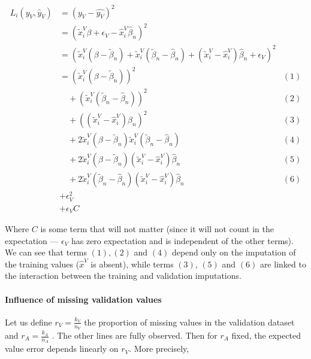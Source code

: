 \begin{align*}
L_i(y_V, \hat{y}_V) &= (y_V - \hat{y_V})^2 &\\
				&= (\tilde{x}_i^V \beta + \epsilon_V - \hat{x}_i^V \hat{\beta}_n)^2 &\\
				   &= (\tilde{x}_i^V(\beta - \tilde{\beta}_n) + \tilde{x}_i^V (\tilde{\beta}_n - \hat{\beta}_n) + (\tilde{x}_i^V - \hat{x}_i^V) \hat{\beta}_n + \epsilon_V)^2 & \\
				   &= (\tilde{x}_i^V (\beta - \tilde{\beta}_n))^2 & (1) \\
				   & \quad + (\tilde{x}_i^V (\tilde{\beta}_n-\hat{\beta}_n))^2 &(2) \\
				   & \quad + ((\tilde{x}_i^V - \hat{x}_i^V) \hat{\beta}_n)^2 &(3) \\
				   & \quad +2 \tilde{x}_i^V (\beta - \tilde{\beta}_n) \tilde{x}_i^V (\tilde{\beta}_n - \hat{\beta}_n) & (4) \\
				   & \quad +2 \tilde{x}_i^V (\beta - \tilde{\beta}_n) (\tilde{x}_i^V - \hat{x}_i^V )\hat{\beta}_n & (5) \\
				   & \quad +2 \tilde{x}_i^V (\tilde{\beta}_n - \hat{\beta}_n) (\tilde{x}_i^V - \hat{x}_i^V) \hat{\beta}_n & (6)\\
				   & + \epsilon_V^2 &\\
				   & + \epsilon_V C
\end{align*}

Where $C$ is some term that will not matter (since it will not count in the expectation --- $\epsilon_V$ has zero expectation and is independent of the other terms). We can see that terms $(1), (2)$ and $(4)$ depend only on the imputation of the training values ($\hat{x}^V$ is absent), while terms $(3)$, $(5)$ and $(6)$ are linked to the interaction between the training and validation imputations.

\paragraph{Influence of missing validation values}

Let us define $r_V = \frac{k_V}{n_V}$ the proportion of missing values in the validation dataset and $r_A = \frac{k_A}{n_A}$ . The other lines are fully observed. Then for $r_A$ fixed, the expected value error depends linearly on $r_V$. More precisely,

